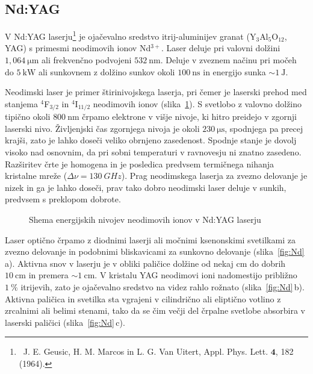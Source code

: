 \subsection{Nd:YAG}
V Nd:YAG laserju\footnote{~J. E. Geusic,
H. M. Marcos in L. G. Van Uitert, Appl. Phys. Lett. $\mathbf{4}$, 182 (1964).} je ojačevalno sredstvo
itrij-aluminijev granat (Y$_3$Al$_5$O$_{12}$, YAG) s primesmi neodimovih ionov Nd$^{3+}$. 
Laser deluje pri valovni dolžini $1,064~\si{\micro\meter}$ ali frekvenčno podvojeni
$532~\si{\nano\metre}$. Deluje v zveznem 
načinu pri močeh do $5~\si{\kilo\watt}$ ali sunkovnem z dolžino sunkov okoli 
$100~\si{\nano\second}$ in energijo sunka $\sim 1~\si{\joule}$.

Neodimski laser je primer štirinivojskega laserja, 
pri čemer je 
laserski prehod med stanjema $^4$F$_{3/2}$ in $^4$I$_{11/2}$ neodimovih ionov 
(slika~\ref{fig:NdE}). S svetlobo z valovno dolžino tipično okoli $800~\si{\nano\metre}$
črpamo elektrone v višje nivoje, ki hitro 
preidejo v zgornji laserski nivo. Življenjski čas zgornjega nivoja je 
okoli $230~\si{\micro\second}$, spodnjega pa precej krajši, zato je 
lahko doseči veliko obrnjeno zasedenost. Spodnje stanje je dovolj visoko nad 
osnovnim, da pri sobni temperaturi v ravnovesju ni znatno zasedeno. 
Razširitev črte je homogena in je posledica predvsem 
termičnega nihanja kristalne mreže ($\Delta \nu = 130~\si{GHz}$). 
Prag neodimskega laserja za zvezno delovanje je nizek in ga je lahko doseči, 
prav tako dobro neodimski laser deluje v sunkih, predvsem s preklopom dobrote.
\begin{figure}[ht]
\centering
\def\svgwidth{85truemm} 

\caption{Shema energijskih nivojev neodimovih ionov v Nd:YAG laserju}
\label{fig:NdE}
\end{figure}

Laser optično črpamo z diodnimi laserji ali močnimi ksenonskimi svetilkami za zvezno delovanje 
in podobnimi bliskavicami za sunkovno delovanje (slika~\ref{fig:Nd}\,a). 
Aktivna snov v laserju je v obliki paličice dolžine od nekaj cm do dobrih 
$10~\si{\centi\metre}$ in premera $\sim 1~\si{\centi\metre}$. 
V kristalu YAG neodimovi ioni nadomestijo približno $1~\%$ itrijevih, zato je ojačevalno
sredstvo na videz rahlo rožnato (slika~\ref{fig:Nd}\,b). 
Aktivna paličica in svetilka sta vgrajeni v cilindrično ali eliptično votlino z 
zrcalnimi ali belimi stenami, tako da se čim večji del črpalne svetlobe absorbira v 
laserski paličici (slika~\ref{fig:Nd}\,c).

